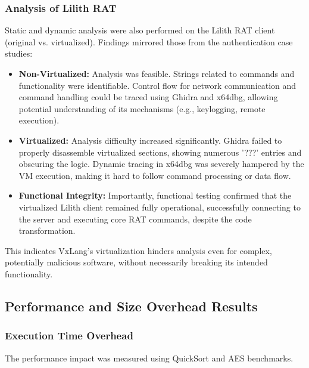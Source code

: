 \subsubsection{Analysis of Lilith RAT}
Static and dynamic analysis were also performed on the Lilith RAT client (original vs. virtualized). Findings mirrored those from the authentication case studies:
    \begin{itemize}
        \item \textbf{Non-Virtualized:} Analysis was feasible. Strings related to commands and functionality were identifiable. Control flow for network communication and command handling could be traced using Ghidra and x64dbg, allowing potential understanding of its mechanisms (e.g., keylogging, remote execution).
        \item \textbf{Virtualized:} Analysis difficulty increased significantly. Ghidra failed to properly disassemble virtualized sections, showing numerous '???' entries and obscuring the logic. Dynamic tracing in x64dbg was severely hampered by the VM execution, making it hard to follow command processing or data flow.
        \item \textbf{Functional Integrity:} Importantly, functional testing confirmed that the virtualized Lilith client remained fully operational, successfully connecting to the server and executing core RAT commands, despite the code transformation.
    \end{itemize}
This indicates VxLang's virtualization hinders analysis even for complex, potentially malicious software, without necessarily breaking its intended functionality.

\subsection{Performance and Size Overhead Results}

\subsubsection{Execution Time Overhead}
The performance impact was measured using QuickSort and AES benchmarks.

